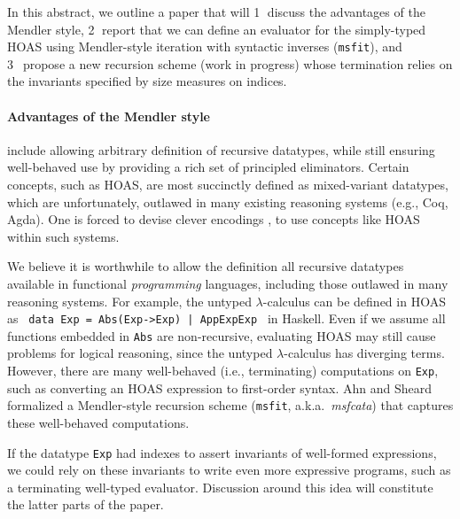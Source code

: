 \documentclass[a4paper]{easychair} %
\newcommand{\eg}[0]{{e.g.}}
\newcommand{\ie}[0]{{i.e.}}
\newcommand{\aka}[0]{{a.k.a.}}
\newcommand{\msfit}[0]{\texttt{msfit}}
\begin{document}
In this abstract, we outline a paper
that will
\textcircled{1} discuss the advantages of the Mendler style,
\textcircled{2} report that we can define an evaluator for the simply-typed HOAS
using Mendler-style iteration with syntactic inverses (\msfit), and
\textcircled{3}~propose a new recursion scheme (work in progress) whose
termination relies on the invariants specified by size measures on indices.
\vspace*{-2ex}
\paragraph{Advantages of the Mendler style\!\!\!}
include allowing arbitrary definition of recursive datatypes, while still 
ensuring well-behaved use by providing a rich set of principled eliminators.
Certain concepts, such as HOAS, are most succinctly defined as
mixed-variant datatypes, which are unfortunately, outlawed in
many existing reasoning systems (\eg, Coq, Agda).
One is forced to devise clever encodings \cite{PHOAS},
to use concepts like HOAS within such systems.

We believe it is worthwhile to allow the definition all recursive datatypes
available in functional \emph{programming} languages, including those outlawed
in many reasoning systems. For example, the untyped $\lambda$-calculus
can be defined in HOAS as
{\small\texttt{\,data Exp~=~Abs\;(Exp\;->\;Exp)~|~App\;Exp\;Exp\,}} in Haskell.
Even if we assume all functions embedded in \texttt{Abs} are non-recursive,
evaluating HOAS may still cause problems for logical reasoning,
since the untyped $\lambda$-calculus has diverging terms. However, there are
many well-behaved (\ie, terminating) computations on \texttt{Exp}, such as
converting an HOAS expression to first-order syntax.
Ahn and Sheard \cite{AhnShe11} formalized a Mendler-style recursion scheme
(\msfit, \aka\ \textit{msfcata}) that captures these well-behaved computations.

If the datatype \texttt{Exp} had indexes to assert invariants of
well-formed expressions, we could rely on these invariants to write
even more expressive programs, such as a terminating well-typed evaluator.
Discussion around this idea will constitute the latter parts of the paper.
\vspace*{-2ex}
\end{document}
